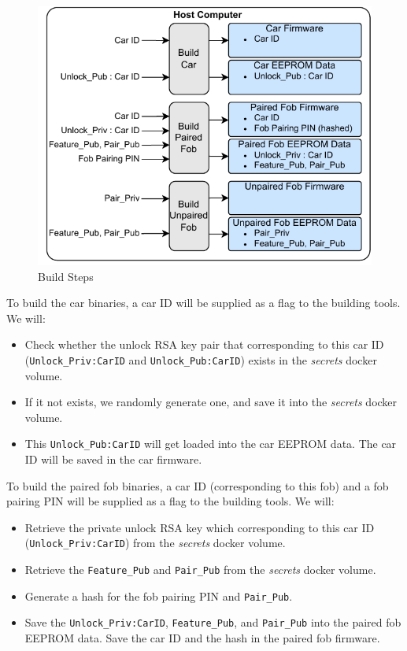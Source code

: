 \documentclass[11pt,oneside,onecolumn,letterpaper]{article}
\begin{document}
\begin{figure}[!htbp]
	\begin{centering}
		\includegraphics[width = .6\textwidth]{pic/build_step.pdf}
		\caption{Build Steps}
		\label{fig:build_step}
	\end{centering}
\end{figure}

To build the car binaries, a car ID will be supplied as a flag to the building tools. We will:
\begin{itemize}
	\item Check whether the unlock RSA key pair that corresponding to this car ID (\verb|Unlock_Priv:CarID| and \verb|Unlock_Pub:CarID|) exists in the \textit{secrets} docker volume.
	\item If it not exists, we randomly generate one, and save it into the \textit{secrets} docker volume.
	\item This \verb|Unlock_Pub:CarID| will get loaded into the car EEPROM data. The car ID will be saved in the car firmware.
\end{itemize}

To build the paired fob binaries, a car ID (corresponding to this fob) and a fob pairing PIN will be supplied as a flag to the building tools. We will:
\begin{itemize}
	\item Retrieve the private unlock RSA key which corresponding to this car ID (\verb|Unlock_Priv:CarID|) from the \textit{secrets} docker volume.
	\item Retrieve the \verb|Feature_Pub| and \verb|Pair_Pub| from the \textit{secrets} docker volume.
	\item Generate a hash for the fob pairing PIN and \verb|Pair_Pub|.
	\item Save the \verb|Unlock_Priv:CarID|, \verb|Feature_Pub|, and \verb|Pair_Pub| into the paired fob EEPROM data. Save the car ID and the hash in the paired fob firmware.
\end{itemize}
\end{document}

